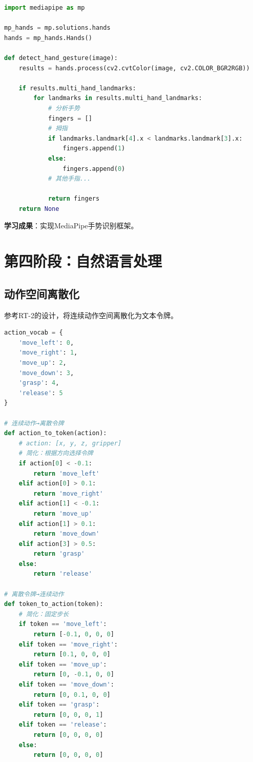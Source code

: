 \documentclass[12pt,a4paper]{article}
\begin{document}
\begin{lstlisting}[language=Python]
import mediapipe as mp

mp_hands = mp.solutions.hands
hands = mp_hands.Hands()

def detect_hand_gesture(image):
    results = hands.process(cv2.cvtColor(image, cv2.COLOR_BGR2RGB))
    
    if results.multi_hand_landmarks:
        for landmarks in results.multi_hand_landmarks:
            # 分析手势
            fingers = []
            # 拇指
            if landmarks.landmark[4].x < landmarks.landmark[3].x:
                fingers.append(1)
            else:
                fingers.append(0)
            # 其他手指...
            
            return fingers
    return None
\end{lstlisting}

\textbf{学习成果}：实现MediaPipe手势识别框架。

\section{第四阶段：自然语言处理}

\subsection{动作空间离散化}

参考RT-2的设计，将连续动作空间离散化为文本令牌。

\begin{lstlisting}[language=Python]
action_vocab = {
    'move_left': 0,
    'move_right': 1,
    'move_up': 2,
    'move_down': 3,
    'grasp': 4,
    'release': 5
}

# 连续动作→离散令牌
def action_to_token(action):
    # action: [x, y, z, gripper]
    # 简化：根据方向选择令牌
    if action[0] < -0.1:
        return 'move_left'
    elif action[0] > 0.1:
        return 'move_right'
    elif action[1] < -0.1:
        return 'move_up'
    elif action[1] > 0.1:
        return 'move_down'
    elif action[3] > 0.5:
        return 'grasp'
    else:
        return 'release'

# 离散令牌→连续动作
def token_to_action(token):
    # 简化：固定步长
    if token == 'move_left':
        return [-0.1, 0, 0, 0]
    elif token == 'move_right':
        return [0.1, 0, 0, 0]
    elif token == 'move_up':
        return [0, -0.1, 0, 0]
    elif token == 'move_down':
        return [0, 0.1, 0, 0]
    elif token == 'grasp':
        return [0, 0, 0, 1]
    elif token == 'release':
        return [0, 0, 0, 0]
    else:
        return [0, 0, 0, 0]
\end{lstlisting}
\end{document}
